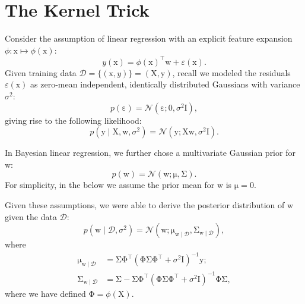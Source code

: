 \documentclass{article}
\newcommand{\given}{\mid}
\newcommand{\mc}[1]{\mathcal{#1}}
\newcommand{\data}{\mc{D}}
\newcommand{\inv}{^{-1}}
\newcommand{\trans}{^\top}
\newcommand{\mat}[1]{\bm{\mathrm{#1}}}
\renewcommand{\vec}[1]{\bm{\mathrm{#1}}}
\renewcommand{\epsilon}{\varepsilon}
\begin{document}
\section*{The Kernel Trick}

Consider the assumption of linear regression with an explicit feature
expansion $\phi\colon \vec{x} \mapsto \phi(\vec{x})$:
\begin{equation*}
  y(\vec{x}) = \phi(\vec{x})\trans \vec{w} + \epsilon(\vec{x}).
\end{equation*}
Given training data $\data = \bigl\{ (\vec{x}, y) \bigr\} = (\mat{X},
\vec{y})$, recall we modeled the residuals $\epsilon(\vec{x})$ as
zero-mean independent, identically distributed Gaussians with variance
$\sigma^2$:
\begin{equation*}
  p(\vec{\epsilon})
  =
  \mc{N}(\vec{\epsilon}; \vec{0}, \sigma^2 \mat{I}),
\end{equation*}
giving rise to the following likelihood:
\begin{equation*}
  p(\vec{y} \given \mat{X}, \vec{w}, \sigma^2)
  =
  \mc{N}(\vec{y}; \mat{X}\vec{w}, \sigma^2 \mat{I}).
\end{equation*}

In Bayesian linear regression, we further chose a multivariate
Gaussian prior for $\vec{w}$:
\begin{equation*}
  p(\vec{w}) = \mc{N}(\vec{w}; \vec{\mu}, \mat{\Sigma}).
\end{equation*}
For simplicity, in the below we assume the prior mean for $\vec{w}$ is
$\vec{\mu} = \vec{0}$.

Given these assumptions, we were able to derive the posterior
distribution of $\vec{w}$ given the data $\data$:
\begin{equation*}
  p(\vec{w} \given \data, \sigma^2)
  =
  \mc{N}(\vec{w};
  \vec{\mu}_{\vec{w}\given\data},
  \mat{\Sigma}_{\vec{w}\given\data}
  ),
\end{equation*}
where
\begin{align*}
  \vec{\mu}_{\vec{w}\given\data}
  &=
  \mat{\Sigma}
  \mat{\Phi}\trans
  (\mat{\Phi}\mat{\Sigma}\mat{\Phi}\trans + \sigma^2 \mat{I})\inv
  \vec{y};
  \\
  \mat{\Sigma}_{\vec{w}\given\data}
  &=
  \mat{\Sigma}
  -
  \mat{\Sigma}
  \mat{\Phi}\trans
  (\mat{\Phi}\mat{\Sigma}\mat{\Phi}\trans + \sigma^2 \mat{I})\inv
  \mat{\Phi}
  \mat{\Sigma},
\end{align*}
where we have defined $\mat{\Phi} = \phi(\mat{X})$.
\end{document}
